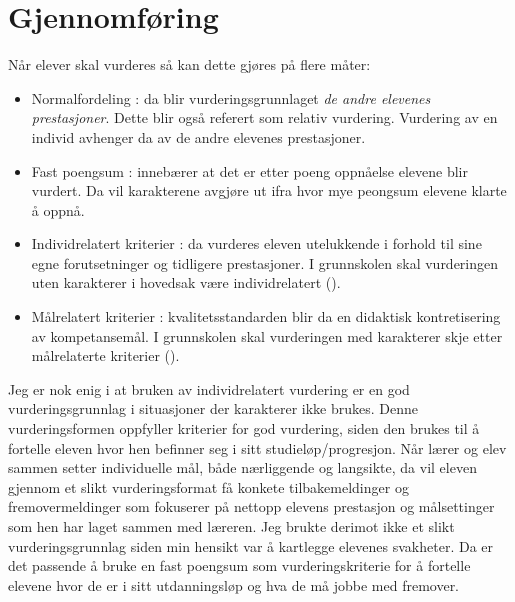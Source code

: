 \documentclass[main.tex]{subfiles}
\begin{document}
\section*{Gjennomføring}
\label{sec:3}
Når elever skal vurderes så kan dette gjøres på flere måter:
\begin{itemize}
\item Normalfordeling : da blir vurderingsgrunnlaget \emph{de andre elevenes prestasjoner}. 
Dette blir også referert som relativ vurdering. Vurdering av en individ avhenger da av de andre
elevenes prestasjoner.
\item Fast poengsum : innebærer at det er etter poeng oppnåelse elevene blir vurdert. Da vil
karakterene avgjøre ut ifra hvor mye peongsum elevene klarte å oppnå.
\item Individrelatert kriterier : da vurderes eleven utelukkende i forhold til sine egne forutsetninger
og tidligere prestasjoner. I grunnskolen skal vurderingen uten karakterer i hovedsak være 
individrelatert  ().
\item Målrelatert kriterier : kvalitetsstandarden blir da en didaktisk kontretisering av kompetansemål.
 I grunnskolen skal vurderingen med karakterer skje etter målrelaterte kriterier ().
\end{itemize}
Jeg er nok enig i at bruken av individrelatert vurdering er en god vurderingsgrunnlag i situasjoner
der karakterer ikke brukes. Denne vurderingsformen oppfyller kriterier for god vurdering,
siden den brukes til å fortelle eleven hvor hen befinner seg i sitt studieløp/progresjon.
Når lærer og elev sammen setter individuelle mål, både nærliggende og langsikte, da vil eleven
gjennom et slikt vurderingsformat få konkete tilbakemeldinger og fremovermeldinger som 
fokuserer på nettopp elevens prestasjon og målsettinger som hen har laget sammen med
læreren.
\newline
\newline
Jeg brukte derimot ikke et slikt vurderingsgrunnlag siden min hensikt var å kartlegge elevenes
svakheter. Da er det passende å bruke en fast poengsum som vurderingskriterie for å 
fortelle elevene hvor de er i sitt utdanningsløp og hva de må jobbe med fremover. 
\end{document}
